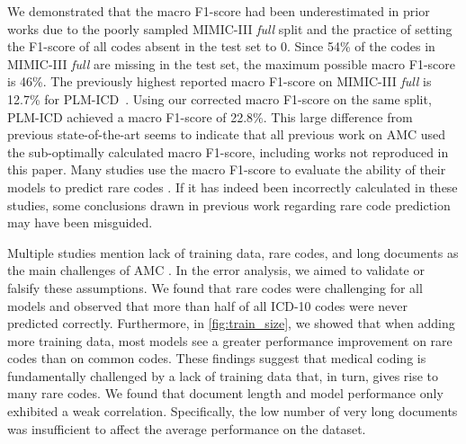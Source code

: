 {We demonstrated that the macro F1-score had been underestimated in prior works due to the poorly sampled MIMIC-III \textit{full} split and the practice of setting the F1-score of all codes absent in the test set to 0. Since 54\% of the codes in MIMIC-III \textit{full} are missing in the test set, the maximum possible macro F1-score is 46\%. The previously highest reported macro F1-score on MIMIC-III \textit{full} is 12.7\% for PLM-ICD~\parencite{kimReadAttendCode2021}. Using our corrected macro F1-score on the same split, PLM-ICD achieved a macro F1-score of 22.8\%. This large difference from previous state-of-the-art seems to indicate that all previous work on AMC used the sub-optimally calculated macro F1-score, including works not reproduced in this paper. Many studies use the macro F1-score to evaluate the ability of their models to predict rare codes \parencite{kimReadAttendCode2021, yuanCodeSynonymsMatter2022}. If it has indeed been incorrectly calculated in these studies, some conclusions drawn in previous work regarding rare code prediction may have been misguided.

Multiple studies mention lack of training data, rare codes, and long documents as the main challenges of AMC \parencite{dongExplainableAutomatedCoding2021,feuchtDescriptionbasedLabelAttention2021,huangPLMICDAutomaticICD2022,jiDoesMagicBERT2021,liICDCodingClinical2020,liuEffectiveConvolutionalAttention2021,moonsComparisonDeepLearning2020,pascualBERTbasedAutomaticICD2021,tengReviewDeepNeural2022,tengExplainablePredictionMedical2020, vuLabelAttentionModel2020, venkateshAutomatingOverburdenedClinical2023}. In the error analysis, we aimed to validate or falsify these assumptions. We found that rare codes were challenging for all models and observed that more than half of all ICD-10 codes were never predicted correctly. Furthermore, in \cref{fig:train_size}, we showed that when adding more training data, most models see a greater performance improvement on rare codes than on common codes. 
These findings suggest that medical coding is fundamentally challenged by a lack of training data that, in turn, gives rise to many rare codes.
We found that document length and model performance only exhibited a weak correlation. Specifically, the low number of very long documents was insufficient to affect the average performance on the dataset. 

}
